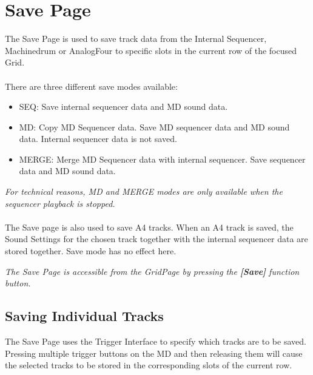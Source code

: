 \chapter{Save Page}

The Save Page is used to save track data from the Internal Sequencer, Machinedrum or AnalogFour to  specific slots in the current row of the focused Grid.\\
\\
There are three different save modes available:
\begin{itemize}
    \item SEQ: Save internal sequencer data and MD sound data.
    \item MD: Copy MD Sequencer data. Save MD sequencer data and MD sound data. Internal sequencer data is not saved.
    \item MERGE: Merge MD Sequencer data with internal sequencer. Save sequencer data and MD sound data.
\end{itemize}
\textit{For technical reasons, MD and MERGE modes are only available when the sequencer playback is stopped.}
\\
\\The Save page is also used to save A4 tracks. When an A4 track is saved, the Sound Settings for the chosen track together with the internal sequencer data are stored together. Save mode has no effect here.



\textit{The Save Page is accessible from the GridPage by pressing the  \textbf{[Save]} function button.}


\section{Saving Individual Tracks}
The Save Page uses the Trigger Interface to specify which tracks are to be saved. Pressing multiple trigger buttons on the MD and then releasing them will cause the selected tracks to be stored in the corresponding slots of the current row.
